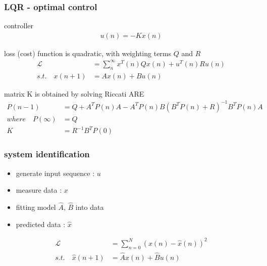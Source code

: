 \documentclass{beamer}
\begin{document}
\begin{frame}
  \frametitle{\bf LQR - optimal control}

  controller
  \begin{align*}
    u(n) = -Kx(n)
  \end{align*}
  
  loss (cost) function is quadratic, with weighting terms $Q$ and $R$
  \begin{align*}
    \mathcal{L} &=\sum_n^{\infty} x^T(n) Q x(n) + u^T(n) R u(n) \\
    s.t. \quad x(n+1) &= Ax(n) + Bu(n) 
  \end{align*}  

  matrix K is obtained by solving Riccati ARE
  \begin{align*}
    P(n-1) &= Q + A^TP(n)A - A^TP(n)B(B^TP(n) + R)^{-1}B^TP(n)A \\
    where \quad P(\infty) &= Q \\
    K &= R^{-1}B^TP(0)
  \end{align*}

\end{frame}

\begin{frame}
  
  \frametitle{\bf system identification}

  \begin{itemize}
    \item generate input sequence : $u$
    \item measure data : $x$
    \item fitting model $\hat{A}$, $\hat{B}$ into data
    \item predicted data : $\hat{x}$
  \end{itemize}
  
  \begin{align*}
    \mathcal{L} &= \sum_{n=0}^{N} (x(n) - \hat{x}(n))^2 \\
    s.t. \quad \hat{x}(n+1) &= \hat{A}x(n) + \hat{B}u(n)
  \end{align*}
 
  
\end{frame}
\end{document}
